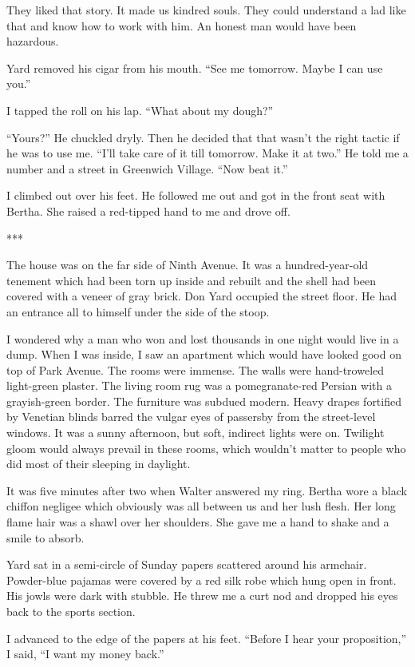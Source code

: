 {They liked that story. It made us kindred souls. They could understand a lad like that and know how to work with him. An honest man would have been hazardous.

Yard removed his cigar from his mouth. “See me tomorrow. Maybe I can use you.”

I tapped the roll on his lap. “What about my dough?”

“Yours?” He chuckled dryly. Then he decided that that wasn’t the right tactic if he was to use me. “I’ll take care of it till tomorrow. Make it at two.” He told me a number and a street in Greenwich Village. “Now beat it.”

I climbed out over his feet. He followed me out and got in the front seat with Bertha. She raised a red-tipped hand to me and drove off.

***

The house was on the far side of Ninth Avenue. It was a hundred-year-old tenement which had been torn up inside and rebuilt and the shell had been covered with a veneer of gray brick. Don Yard occupied the street floor. He had an entrance all to himself under the side of the stoop.

I wondered why a man who won and lost thousands in one night would live in a dump. When I was inside, I saw an apartment which would have looked good on top of Park Avenue. The rooms were immense. The walls were hand-troweled light-green plaster. The living room rug was a pomegranate-red Persian with a grayish-green border. The furniture was subdued modern. Heavy drapes fortified by Venetian blinds barred the vulgar eyes of passersby from the street-level windows. It was a sunny afternoon, but soft, indirect lights were on. Twilight gloom would always prevail in these rooms, which wouldn’t matter to people who did most of their sleeping in daylight.

It was five minutes after two when Walter answered my ring. Bertha wore a black chiffon negligee which obviously was all between us and her lush flesh. Her long flame hair was a shawl over her shoulders. She gave me a hand to shake and a smile to absorb.

Yard sat in a semi-circle of Sunday papers scattered around his armchair. Powder-blue pajamas were covered by a red silk robe which hung open in front. His jowls were dark with stubble. He threw me a curt nod and dropped his eyes back to the sports section.

I advanced to the edge of the papers at his feet. “Before I hear your proposition,” I said, “I want my money back.”

}
